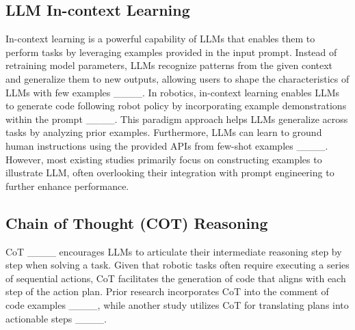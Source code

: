 \subsection{LLM In-context Learning}
In-context learning is a powerful capability of LLMs that enables them to perform tasks by leveraging examples provided in the input prompt. Instead of retraining model parameters, LLMs recognize patterns from the given context and generalize them to new outputs, allowing users to shape the characteristics of LLMs with few examples ____. In robotics, in-context learning enables LLMs to generate code following robot policy by incorporating example demonstrations within the prompt  ____. This paradigm approach helps LLMs generalize across tasks by analyzing prior examples. Furthermore, LLMs can learn to ground human instructions using the provided APIs from few-shot examples ____. However, most existing studies primarily focus on constructing examples to illustrate LLM, often overlooking their integration with prompt engineering to further enhance performance.


\subsection{Chain of Thought (COT) Reasoning}
CoT ____ encourages LLMs to articulate their intermediate reasoning step by step when solving a task. Given that robotic tasks often require executing a series of sequential actions, CoT facilitates the generation of code that aligns with each step of the action plan. Prior research incorporates CoT into the comment of code examples ____, while another study utilizes CoT for translating plans into actionable steps ____. %

